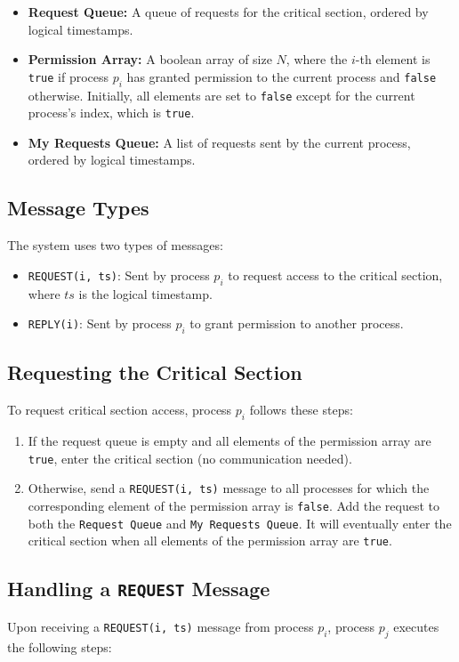 \begin{itemize}
    \item \textbf{Request Queue:} A queue of requests for the critical section, ordered by logical timestamps.
    \item \textbf{Permission Array:} A boolean array of size \( N \), where the \( i \)-th element is \texttt{true} if process \( p_i \) has granted permission to the current process and \texttt{false} otherwise. Initially, all elements are set to \texttt{false} except for the current process's index, which is \texttt{true}.
    \item \textbf{My Requests Queue:} A list of requests sent by the current process, ordered by logical timestamps.
\end{itemize}

\subsection{Message Types}
The system uses two types of messages:
\begin{itemize}
    \item \texttt{REQUEST(i, ts)}: Sent by process \( p_i \) to request access to the critical section, where \( ts \) is the logical timestamp.
    \item \texttt{REPLY(i)}: Sent by process \( p_i \) to grant permission to another process.
\end{itemize}

\subsection{Requesting the Critical Section}
To request critical section access, process \( p_i \) follows these steps:

\begin{enumerate}
    \item If the request queue is empty and all elements of the permission array are \texttt{true}, enter the critical section (no communication needed).
    \item Otherwise, send a \texttt{REQUEST(i, ts)} message to all processes for which the corresponding element of the permission array is \texttt{false}. Add the request to both the \texttt{Request Queue} and \texttt{My Requests Queue}. It will eventually enter the critical section when all elements of the permission array are \texttt{true}.
\end{enumerate}

\subsection{Handling a \texttt{REQUEST} Message}
Upon receiving a \texttt{REQUEST(i, ts)} message from process \( p_i \), process \( p_j \) executes the following steps:

